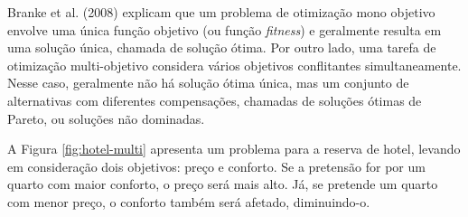 Branke et al. (2008) \cite{branke2008multiobjective} explicam que um problema de otimização mono objetivo envolve uma única função objetivo (ou função \textit{fitness}) e geralmente resulta em uma solução única, chamada de solução ótima. Por outro lado, uma tarefa de otimização multi-objetivo considera vários objetivos conflitantes simultaneamente. Nesse caso, geralmente não há solução ótima única, mas um conjunto de alternativas com diferentes compensações, chamadas de soluções ótimas de Pareto, ou soluções não dominadas.

A Figura \ref{fig:hotel-multi} apresenta um problema para a reserva de hotel, levando em consideração dois objetivos: preço e conforto. Se a pretensão for por um quarto com maior conforto, o preço será mais alto. Já, se pretende um quarto com menor preço, o conforto também será afetado, diminuindo-o.

